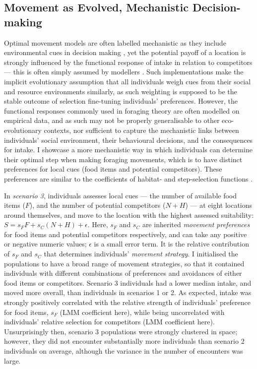 \subsection*{Movement as Evolved, Mechanistic Decision-making}

Optimal movement models are often labelled mechanistic as they include environmental cues in decision making \citep[e.g.][]{scherer2020}, yet the potential payoff of a location is strongly influenced by the functional response of intake in relation to competitors --- this is often simply assumed by modellers \citep[][]{vandermeer1997}.
Such implementations make the implicit evolutionary assumption that all individuals weigh cues from their social and resource environments similarly, as such weighting is supposed to be the stable outcome of selection fine-tuning individuals' preferences.
However, the functional responses commonly used in foraging theory are often modelled on empirical data, and as such may not be properly generalisable to other eco-evolutionary contexts, nor sufficient to capture the mechanistic links between individuals' social environment, their behavioural decisions, and the consequences for intake.
I showcase a more mechanistic way in which individuals can determine their optimal step when making foraging movements, which is to have distinct preferences for local cues (food items and potential competitors).
These preferences are similar to the coefficients of habitat- and step-selection functions \citep[][; see more below]{fortin2005,avgar2013,avgar2016,fieberg2010}.

In \textit{scenario 3}, individuals assesses local cues --- the number of available food items ($F$), and the number of potential competitors ($N + H$) --- at eight locations around themselves, and move to the location with the highest assessed suitability: $S = s_FF + s_C(N + H) + \epsilon$.
Here, $s_F$ and $s_C$ are inherited \textit{movement preferences} for food items and potential competitors respectively, and can take any positive or negative numeric values; $\epsilon$ is a small error term.
It is the relative contribution of $s_F$ and $s_C$ that determines individuals' \textit{movement strategy}.
I initialised the populations to have a broad range of movement strategies, so that it contained individuals with different combinations of preferences and avoidances of either food items or competitors.
Scenario 3 individuals had a lower median intake, and moved more overall, than individuals in scenarios 1 or 2.
As expected, intake was strongly positively correlated with the relative strength of individuals' preference for food items, $s_F$ (LMM coefficient here), while being uncorrelated with individuals' relative selection for competitors (LMM coefficient here).
Unsurprisingly then, scenario 3 populations were strongly clustered in space; however, they did not encounter substantially more individuals than scenario 2 individuals on average, although the variance in the number of encounters was large.

